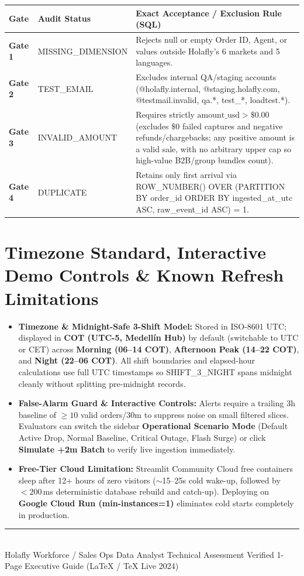 \documentclass[10pt,letterpaper]{article}
\newcommand{\code}[1]{{\fontfamily{pcr}\selectfont\footnotesize\color{ink}#1}}
\newcommand{\hbullet}{\textcolor{holaflyred}{\rule[0.45ex]{0.40ex}{0.40ex}}}
\begin{document}
\vspace{1pt}
\renewcommand{\arraystretch}{1.10}
\begin{tabularx}{\textwidth}{@{}l l >{\raggedright\arraybackslash}X@{}}
\toprule
\rowcolor{linen}
\textbf{\color{ink}Gate} & \textbf{\color{ink}Audit Status} & \textbf{\color{ink}Exact Acceptance / Exclusion Rule (SQL)} \\
\midrule
\textbf{\color{ink}Gate 1} & \code{MISSING\_DIMENSION} & Rejects null or empty \code{Order ID}, \code{Agent}, or values outside Holafly's 6 markets and 5 languages. \\
\rowcolor{cream}
\textbf{\color{ink}Gate 2} & \code{TEST\_EMAIL} & Excludes internal QA/staging accounts (\code{@holafly.internal}, \code{@staging.holafly.com}, \code{@testmail.invalid}, \code{qa.*}, \code{test\_*}, \code{loadtest.*}). \\
\textbf{\color{ink}Gate 3} & \code{INVALID\_AMOUNT} & Requires strictly $\text{amount\_usd} > \$0.00$ (excludes $\$0$ failed captures and negative refunds/chargebacks; any positive amount is a valid sale, with no arbitrary upper cap so high-value B2B/group bundles count). \\
\rowcolor{cream}
\textbf{\color{ink}Gate 4} & \code{DUPLICATE} & Retains only first arrival via \code{ROW\_NUMBER() OVER (PARTITION BY order\_id ORDER BY ingested\_at\_utc ASC, raw\_event\_id ASC) = 1}. \\
\bottomrule
\end{tabularx}

\section{Timezone Standard, Interactive Demo Controls \& Known Refresh Limitations}
\begin{itemize}[leftmargin=1.15em, itemsep=1.4pt, topsep=1.5pt, label=\hbullet]
  \item \textbf{Timezone \& Midnight-Safe 3-Shift Model:} Stored in ISO-8601 UTC; displayed in \textbf{COT (UTC-5, Medell\'in Hub)} by default (switchable to UTC or CET) across \textbf{Morning (06--14 COT)}, \textbf{Afternoon Peak (14--22 COT)}, and \textbf{Night (22--06 COT)}. All shift boundaries and elapsed-hour calculations use full UTC timestamps so \code{SHIFT\_3\_NIGHT} spans midnight cleanly without splitting pre-midnight records.
  \item \textbf{False-Alarm Guard \& Interactive Controls:} Alerts require a trailing 3h baseline of $\geq 10$ valid orders/30m to suppress noise on small filtered slices. Evaluators can switch the sidebar \textbf{Operational Scenario Mode} (Default Active Drop, Normal Baseline, Critical Outage, Flash Surge) or click \textbf{Simulate +2m Batch} to verify live ingestion immediately.
  \item \textbf{Free-Tier Cloud Limitation:} Streamlit Community Cloud free containers sleep after 12+ hours of zero visitors ($\sim$15--25s cold wake-up, followed by $<200$\,ms deterministic database rebuild and catch-up). Deploying on \textbf{Google Cloud Run (\code{min-instances=1})} eliminates cold starts completely in production.
\end{itemize}

\vfill
{\color{hairline}\rule{\textwidth}{0.5pt}}\\[2pt]
{\fontsize{7.5}{9}\selectfont\color{graphite}%
Holafly Workforce / Sales Ops Data Analyst Technical Assessment \hfill Verified 1-Page Executive Guide (LaTeX / TeX Live 2024)}
\end{document}
